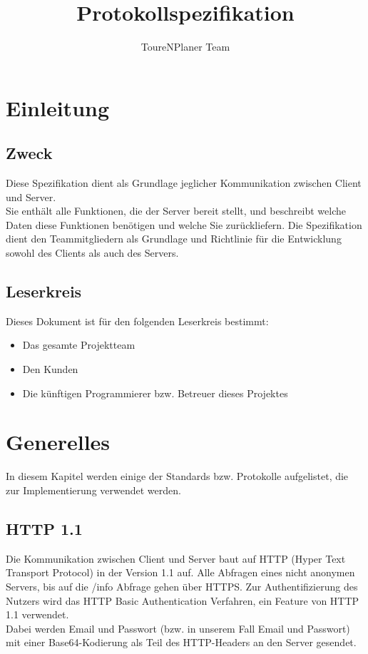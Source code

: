 \documentclass[ngerman,titlepage,parskip=true]{scrartcl}
\title{Protokollspezifikation}
\author{ToureNPlaner Team}
\begin{document}
\maketitle

\tableofcontents

\pagebreak

\section{Einleitung}

	\subsection{Zweck}
	
	Diese Spezifikation dient als Grundlage jeglicher Kommunikation zwischen Client und Server.\\
	Sie enthält alle Funktionen, die der Server bereit stellt, und beschreibt welche Daten diese Funktionen benötigen und welche Sie zurückliefern. 
	Die Spezifikation dient den Teammitgliedern als Grundlage und Richtlinie für die Entwicklung sowohl des Clients als auch des Servers.
	
	\subsection{Leserkreis}
	
	Dieses Dokument ist für den folgenden Leserkreis bestimmt:
	
	\begin{itemize}
		\item Das gesamte Projektteam
		\item Den Kunden
		\item Die künftigen Programmierer bzw. Betreuer dieses Projektes
	\end{itemize}
	
\section{Generelles}

	In diesem Kapitel werden einige der Standards bzw. Protokolle aufgelistet, die zur Implementierung verwendet werden.

	\subsection{HTTP 1.1}

	Die Kommunikation zwischen Client und Server baut auf HTTP (Hyper Text Transport Protocol) in der Version 1.1 auf. Alle Abfragen eines nicht anonymen Servers, bis auf die /info Abfrage gehen über HTTPS.
	Zur Authentifizierung des Nutzers wird das HTTP Basic Authentication Verfahren, ein Feature von HTTP 1.1 verwendet.\\
	Dabei werden Email und Passwort (bzw. in unserem Fall Email und Passwort) mit einer Base64-Kodierung als Teil des HTTP-Headers an den Server gesendet.
	
\end{document}
